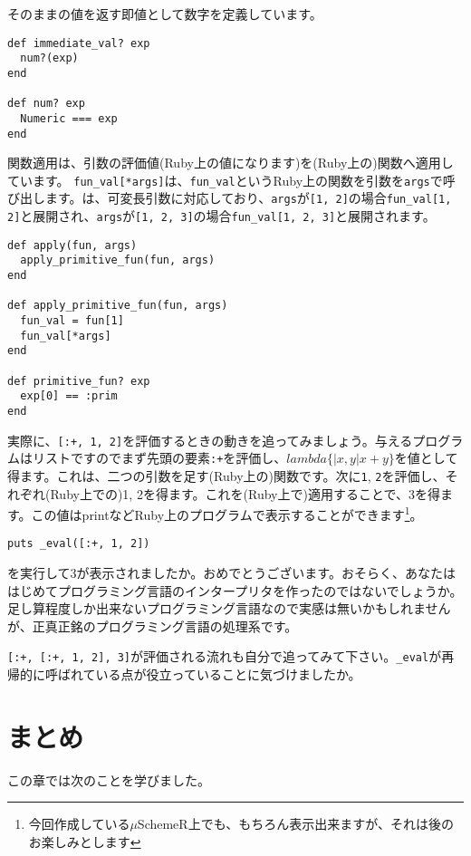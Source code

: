 そのままの値を返す即値として数字を定義しています。

\begin{lstlisting}
def immediate_val? exp
  num?(exp) 
end

def num? exp
  Numeric === exp
end
\end{lstlisting}

関数適用は、引数の評価値(Ruby上の値になります)を(Ruby上の)関数へ適用しています。
{\tt fun\_val[*args]}は、{\tt fun\_val}というRuby上の関数を引数を{\tt args}で呼び出します。{\tt *}は、可変長引数に対応しており、{\tt args}が{\tt [1, 2]}の場合{\tt fun\_val[1, 2]}と展開され、{\tt args}が{\tt [1, 2, 3]}の場合{\tt fun\_val[1, 2, 3]}と展開されます。

\begin{lstlisting}
def apply(fun, args)
  apply_primitive_fun(fun, args)
end

def apply_primitive_fun(fun, args)
  fun_val = fun[1]
  fun_val[*args]
end

def primitive_fun? exp
  exp[0] == :prim
end
\end{lstlisting}

実際に、{\tt [:+, 1, 2]}を評価するときの動きを追ってみましょう。与えるプログラムはリストですのでまず先頭の要素{\tt :+}を評価し、$lambda\{|x, y| x + y\}$を値として得ます。これは、二つの引数を足す(Ruby上の)関数です。次に{\tt 1}, {\tt 2}を評価し、それぞれ(Ruby上での)1, 2を得ます。これを(Ruby上で)適用することで、3を得ます。この値はprintなどRuby上のプログラムで表示することができます\footnote{今回作成している$\mu$SchemeR上でも、もちろん表示出来ますが、それは後のお楽しみとします}。

\begin{lstlisting}
puts _eval([:+, 1, 2])
\end{lstlisting}

を実行して3が表示されましたか。おめでとうございます。おそらく、あなたははじめてプログラミング言語のインタープリタを作ったのではないでしょうか。足し算程度しか出来ないプログラミング言語なので実感は無いかもしれませんが、正真正銘のプログラミング言語の処理系です。

{\tt [:+, [:+, 1, 2], 3]}が評価される流れも自分で追ってみて下さい。{\tt \_eval}が再帰的に呼ばれている点が役立っていることに気づけましたか。

\section{まとめ}

この章では次のことを学びました。

